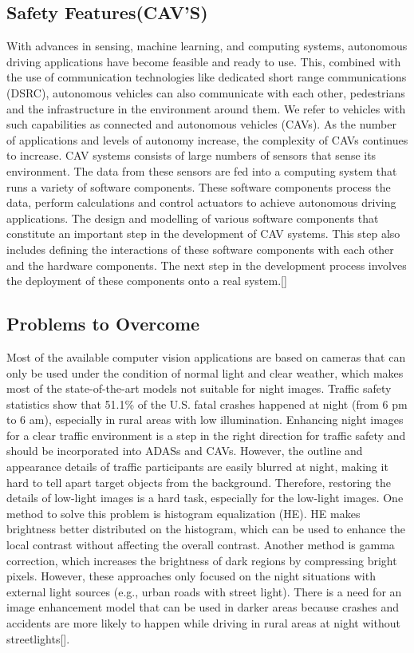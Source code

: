 \documentclass{article}
\begin{document}
\subsection{Safety Features(CAV’S)}

With advances in sensing, machine learning, and computing systems, autonomous driving applications have become feasible and ready to use. This, combined with the use of communication technologies like dedicated short range communications (DSRC), autonomous vehicles can also communicate with each other, pedestrians and the infrastructure in the environment around them. We refer to vehicles with such capabilities as connected and autonomous vehicles (CAVs). As the number of applications and levels of autonomy increase, the complexity of CAVs continues to increase.
\bigbreak
 CAV systems consists of large numbers of sensors that sense its environment. The data from these sensors are fed into a computing system that runs a variety of software components. These software components process the data, perform calculations and control actuators to achieve autonomous driving applications. The design and modelling of various software components that constitute an important step in the development of CAV systems. This step also includes defining the interactions of these software components with each other and the hardware components. The next step in the development process involves the deployment of these components onto a real system.[\textcite{bhat2018tools}]

\subsection{Problems to Overcome}

 Most of the available computer vision applications are based on cameras that can only be used under the condition of normal light and clear weather, which makes most of the state-of-the-art models not suitable for night images. Traffic safety statistics show that 51.1\% of the U.S. fatal crashes happened at night (from 6 pm to 6 am), especially in rural areas with low illumination. Enhancing  night images for a clear traffic environment is a step in the right direction for traffic safety and should be incorporated into ADASs and CAVs.
 \bigbreak
However, the outline and appearance details of traffic participants are easily blurred at night, making it hard to tell apart target objects from the background. Therefore, restoring the details of low-light images is a hard task, especially for the low-light images. One method to solve this problem is histogram equalization (HE). HE makes brightness better distributed on the histogram, which can be used to enhance the local contrast without affecting the overall contrast. Another method is gamma correction, which increases the brightness of dark regions by compressing bright pixels. However, these approaches only focused on the night situations with external light sources (e.g., urban roads with street light). There is a need for an image enhancement model that can be used in darker areas because crashes and accidents are more likely to happen while driving in rural areas at night without streetlights[\textcite{li2021deep}].
\end{document}
